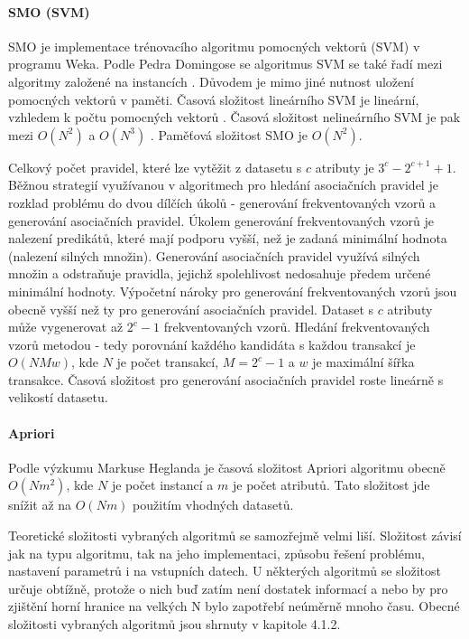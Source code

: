 \documentclass[12pt]{article}
\begin{document}
\paragraph{SMO (SVM)}
SMO je implementace trénovacího algoritmu pomocných vektorů (SVM) v programu Weka. Podle Pedra Domingose se algoritmus SVM se také řadí mezi algoritmy založené na instancích \citep{pedro}. Důvodem je mimo jiné nutnost uložení pomocných vektorů v paměti. Časová složitost lineárního SVM je lineární, vzhledem k počtu pomocných vektorů \citep{oli}. Časová složitost nelineárního SVM je pak mezi $O(N^2)$ a $O(N^3)$ \citep{lin}. Paměťová složitost SMO je $O(N^2)$. \citep{zeng}

Celkový počet pravidel, které lze vytěžit z datasetu s $c$ atributy je $3^c - 2^{c+1} + 1$. Běžnou strategií využívanou v algoritmech pro hledání asociačních pravidel je rozklad problému do dvou dílčích úkolů - generování frekventovaných vzorů a generování asociačních pravidel. Úkolem generování frekventovaných vzorů je nalezení predikátů, které mají podporu vyšší, než je zadaná minimální hodnota (nalezení silných množin). Generování asociačních pravidel využívá silných množin a odstraňuje pravidla, jejichž spolehlivost nedosahuje předem určené minimální hodnoty. Výpočetní nároky pro generování frekventovaných vzorů jsou obecně vyšší než ty pro generování asociačních pravidel. Dataset s $c$ atributy může vygenerovat až $2^c-1$ frekventovaných vzorů. Hledání frekventovaných vzorů metodou  - tedy porovnání každého kandidáta s každou transakcí je $O(N M w)$, kde $N$ je počet transakcí, $M=2^c-1$ a $w$ je maximální šířka transakce. Časová složitost pro generování asociačních pravidel roste lineárně s velikostí datasetu. \citep{tan}
\paragraph{Apriori}
Podle výzkumu Markuse Heglanda je časová složitost Apriori algoritmu obecně $O(Nm^2)$, kde $N$ je počet instancí a $m$ je počet atributů. Tato složitost jde snížit až na $O(Nm)$ použitím vhodných datasetů. \citep{hegland}


Teoretické složitosti vybraných algoritmů se samozřejmě velmi liší. Složitost závisí jak na typu algoritmu, tak na jeho implementaci, způsobu řešení problému, nastavení parametrů i na vstupních datech. U některých algoritmů se složitost určuje obtížně, protože o nich buď zatím není dostatek informací a nebo by pro zjištění horní hranice na velkých N bylo zapotřebí neúměrně mnoho času. Obecné složitosti vybraných algoritmů jsou shrnuty v kapitole 4.1.2. 
\end{document}
